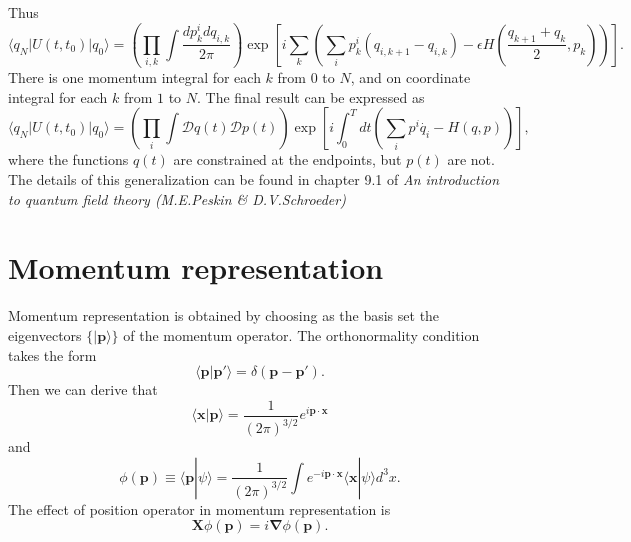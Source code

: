 Thus
\[\langle q_{N} | U(t,t_0) | q_{0}\rangle = \left( \prod_{i,k} \int \frac{dp^i_k dq_{i,k}}{2\pi}\right) \exp \left[ i\sum_k \left( \sum_i p_k^i (q_{i,k+1} - q_{i,k})-\epsilon H \left( \frac{q_{k+1}+q_{k}}{2},p_k\right)\right) \right].\]
There is one momentum integral for each $k$ from $0$ to $N$, and on coordinate integral for each $k$ from $1$ to $N$.
The final result can be expressed as
\[\langle q_{N} | U(t,t_0) | q_{0}\rangle = \left( \prod_{i} \int \mathcal{D}q(t) \mathcal{D}p(t) \right) \exp \left[ i \int_0^T dt \left( \sum_i p^i \dot{q_i} - H \left( q,p\right)\right) \right],\]
where the functions $q(t)$ are constrained at the endpoints, but $p(t)$ are not.
The details of this generalization can be found in  chapter 9.1 of \emph{An introduction to quantum field theory (M.E.Peskin \& D.V.Schroeder)}

\section{Momentum representation}
Momentum representation is obtained by choosing as the basis set the eigenvectors $\{|\bm{p}\rangle\}$ of the momentum operator. The orthonormality condition takes the form
\[\langle \bm{p} | \bm{p}' \rangle = \delta(\bm{p}-\bm{p}').\]
Then we can derive that
\[\langle \bm{x} | \bm{p} \rangle = \frac{1}{(2\pi)^{3/2}} e^{i\bm{p}\cdot\bm{x}}\]
and
\[\phi(\bm{p}) \equiv \langle \bm{p} | \psi \rangle = \frac{1}{(2\pi)^{3/2}} \int e^{-i\bm{p}\cdot\bm{x}} \langle \bm{x} | \psi \rangle d^3 x.\]
The effect of position operator in momentum representation is
\[\bm{X}\phi(\bm{p}) = i\bm{\nabla} \phi(\bm{p}).\]

